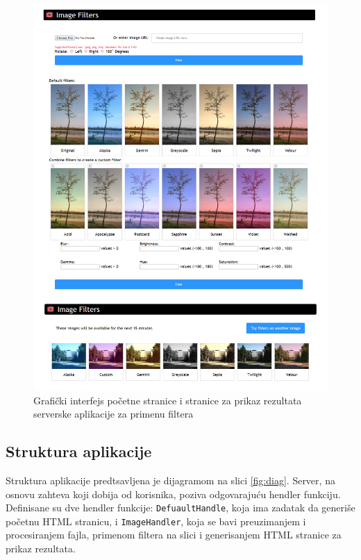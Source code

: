 \documentclass[12pt,oneside]{memoir}
\begin{document}
\begin{figure}
\begin{center}
\includegraphics[scale=1.4]{interface.png}
\end{center}
\caption{Grafički interfejs početne stranice i stranice za prikaz rezultata serverske aplikacije za primenu filtera}
\label{fig:interface}
\end{figure}

\subsection{Struktura aplikacije}
Struktura aplikacije predtsavljena je dijagramom na slici \ref{fig:diag}. Server, na osnovu zahteva koji dobija od korisnika, poziva odgovarajuću hendler funkciju. Definisane su dve hendler funkcije: \texttt{DefuaultHandle}, koja ima zadatak da generiše početnu HTML stranicu, i \texttt{ImageHandler}, koja se bavi preuzimanjem i procesiranjem fajla, primenom filtera na slici i generisanjem HTML stranice za prikaz rezultata. 
 
\end{document}
